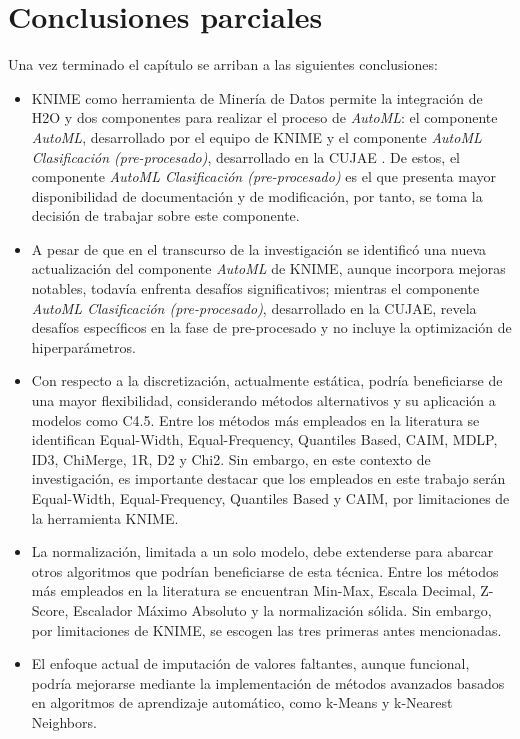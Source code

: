 \section{Conclusiones parciales}
Una vez terminado el capítulo se arriban a las siguientes conclusiones:
\begin{itemize}
	\item KNIME como herramienta de Minería de Datos permite la integración de H2O y dos componentes para realizar el proceso de \textit{AutoML}: el componente \textit{AutoML}, desarrollado por el equipo de KNIME y el componente\textit{ AutoML Clasificación (pre-procesado)}, desarrollado en la CUJAE \citep{Carrazana2022}. De estos, el componente \textit{AutoML Clasificación (pre-procesado)} es el que presenta mayor disponibilidad de documentación y de modificación, por tanto, se toma la decisión de trabajar sobre este componente. 
	\item  A pesar de que en el transcurso de la investigación se identificó una nueva actualización del componente \textit{AutoML} de KNIME, aunque incorpora mejoras notables, todavía enfrenta desafíos significativos; mientras el componente \textit{AutoML Clasificación (pre-procesado)}, desarrollado en la CUJAE, revela desafíos específicos en la fase de pre-procesado y no incluye la optimización de hiperparámetros.
	\item Con respecto a la discretización, actualmente estática, podría beneficiarse de una mayor flexibilidad, considerando métodos alternativos y su aplicación a modelos como C4.5. Entre los métodos más empleados en la literatura se identifican Equal-Width, Equal-Frequency, Quantiles Based, CAIM, MDLP, ID3, ChiMerge, 1R, D2 y Chi2. Sin embargo, en este contexto de investigación, es importante destacar que los empleados en este trabajo serán Equal-Width, Equal-Frequency, Quantiles Based y CAIM, por limitaciones de la herramienta KNIME.
	\item La normalización, limitada a un solo modelo, debe extenderse para abarcar otros algoritmos que podrían beneficiarse de esta técnica. Entre los métodos más empleados en la literatura se encuentran Min-Max, Escala Decimal, Z-Score, Escalador Máximo Absoluto y la normalización sólida. Sin embargo, por limitaciones de KNIME, se escogen las tres primeras antes mencionadas.
	\item El enfoque actual de imputación de valores faltantes, aunque funcional, podría mejorarse mediante la implementación de métodos avanzados basados en algoritmos de aprendizaje automático, como k-Means y k-Nearest Neighbors.

\end{itemize}
